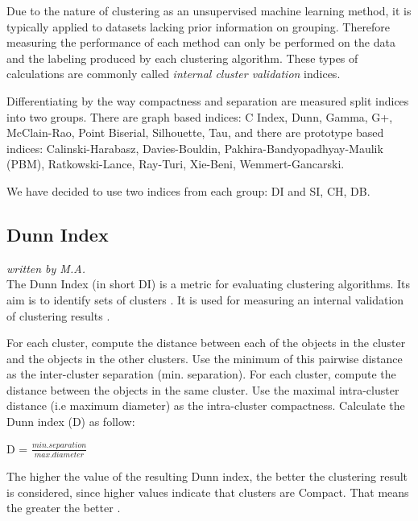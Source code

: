 Due to the nature of clustering as an unsupervised machine learning method, it is typically applied to datasets lacking prior information on grouping. Therefore measuring the performance of each method can only be performed on the data and the labeling produced by each clustering algorithm. These types of calculations are commonly called \textit{internal cluster validation} indices.

Differentiating by the way compactness and separation are measured \cite{balbi2016cosine} split indices into two groups. There are graph based indices: C Index, Dunn, Gamma, G+, McClain-Rao, Point Biserial, Silhouette, Tau, and there are prototype based indices: Calinski-Harabasz, Davies-Bouldin, Pakhira-Bandyopadhyay-Maulik (PBM), Ratkowski-Lance, Ray-Turi, Xie-Beni, Wemmert-Gancarski. 

We have decided to use two indices from each group: \gls{DI} and \gls{SI}, \gls{CH}, \gls{DB}.


\subsection{Dunn Index}
\textit{written by M.A.}\\


The Dunn Index (in short DI) is a metric for evaluating clustering algorithms. Its aim is to identify sets of clusters \cite{dunn2016rizzo}. It is used for measuring an internal validation of clustering results \cite{BENNCIR2021102751}. \newline

For each cluster, compute the distance between each of the objects in the cluster and the objects in the other clusters. Use the minimum of this pairwise distance as the inter-cluster separation (min. separation). For each cluster, compute the distance between the objects in the same cluster. Use the maximal intra-cluster distance (i.e maximum diameter) as the intra-cluster compactness. Calculate the Dunn index (D) as follow: \newline

D = $\frac{min.separation}{max.diameter}$ \cite{BENNCIR2021102751} \newline

The higher the value of the resulting Dunn index, the better the clustering
result is considered, since higher values indicate that clusters are Compact.
That means the greater the better \cite{dunnblog2019rizzo}.

